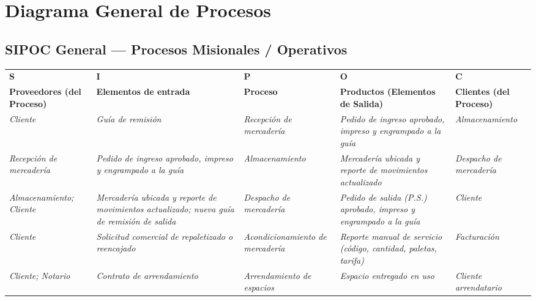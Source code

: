 \documentclass[11pt,letterpaper]{report}
\begin{document}
\section{Diagrama General de Procesos}

\subsection*{SIPOC General — Procesos Misionales / Operativos}
\begin{center}
  \small
  \begin{tabularx}{\textwidth}{>{\centering\arraybackslash}X >{\centering\arraybackslash}X >{\centering\arraybackslash}X >{\centering\arraybackslash}X >{\centering\arraybackslash}X}
  \toprule
  \textbf{S} & \textbf{I} & \textbf{P} & \textbf{O} & \textbf{C} \\
  \textbf{Proveedores (del Proceso)} & \textbf{Elementos de entrada} & \textbf{Proceso} & \textbf{Productos (Elementos de Salida)} & \textbf{Clientes (del Proceso)} \\
  \midrule
  \textit{Cliente} & \textit{Guía de remisión} & \textit{Recepción de mercadería} & \textit{Pedido de ingreso aprobado, impreso y engrampado a la guía} & \textit{Almacenamiento} \\
  \midrule
  \textit{Recepción de mercadería} & \textit{Pedido de ingreso aprobado, impreso y engrampado a la guía} & \textit{Almacenamiento} & \textit{Mercadería ubicada y reporte de movimientos actualizado} & \textit{Despacho de mercadería} \\
  \midrule
  \textit{Almacenamiento; Cliente} & \textit{Mercadería ubicada y reporte de movimientos actualizado; nueva guía de remisión de salida} & \textit{Despacho de mercadería} & \textit{Pedido de salida (P.S.) aprobado, impreso y engrampado a la guía} & \textit{Cliente} \\
  \midrule
  \textit{Cliente} & \textit{Solicitud comercial de repaletizado o reencajado} & \textit{Acondicionamiento de mercadería} & \textit{Reporte manual de servicio (código, cantidad, paletas, tarifa)} & \textit{Facturación} \\
  \midrule
  \textit{Cliente; Notario} & \textit{Contrato de arrendamiento} & \textit{Arrendamiento de espacios} & \textit{Espacio entregado en uso} & \textit{Cliente arrendatario} \\
  \bottomrule
  \end{tabularx}
\end{center}
\end{document}
